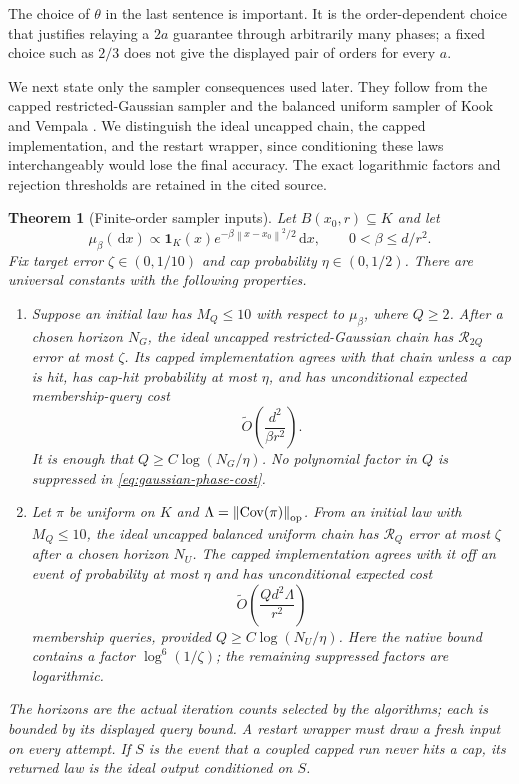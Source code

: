 \documentclass[11pt]{article}
\newtheorem{theorem}{Theorem}[section]
\theoremstyle{remark}
\newcommand{\1}{\bm 1}
\newcommand{\Cov}{\operatorname{Cov}}
\newcommand{\dd}{\,\mathrm d}
\newcommand{\norm}[1]{\left\lVert #1\right\rVert}
\begin{document}
The choice of $\theta$ in the last sentence is important.  It is the
order-dependent choice that justifies relaying a $2a$ guarantee through
arbitrarily many phases; a fixed choice such as $2/3$ does not give the
displayed pair of orders for every $a$.

We next state only the sampler consequences used later.  They follow
from the capped restricted-Gaussian sampler and the balanced uniform
sampler of Kook and Vempala
\citep[Theorems~1.1 and~1.4 and Proposition~4.1]{KV26zeroth}.  We
distinguish the ideal uncapped chain, the capped implementation, and the
restart wrapper, since conditioning these laws interchangeably would
lose the final accuracy.  The exact logarithmic factors and rejection
thresholds are retained in the cited source.

\begin{theorem}[Finite-order sampler inputs]
\label{thm:sampler-inputs}
Let $B(x_0,r)\subseteq K$ and let
\[
  \mu_\beta(\dd x)\propto
  \1_K(x)e^{-\beta\norm{x-x_0}^2/2}\dd x,
  \qquad 0<\beta\leq d/r^2.
\]
Fix target error $\zeta\in(0,1/10)$ and cap probability
$\eta\in(0,1/2)$.  There are universal constants with the following
properties.

\begin{enumerate}[label=(\roman*)]
\item Suppose an initial law has $M_Q\leq10$ with respect to
  $\mu_\beta$, where $Q\geq2$.  After a chosen horizon $N_G$, the ideal
  uncapped restricted-Gaussian chain has $\mathcal R_{2Q}$ error at most
  $\zeta$.  Its capped implementation agrees with that chain unless a
  cap is hit, has cap-hit probability at most $\eta$, and has
  unconditional expected membership-query cost
  \begin{equation}\label{eq:gaussian-phase-cost}
    \widetilde O\!\left(\frac{d^2}{\beta r^2}\right).
  \end{equation}
  It is enough that $Q\geq C\log(N_G/\eta)$.  No polynomial factor in
  $Q$ is suppressed in \eqref{eq:gaussian-phase-cost}.

\item Let $\pi$ be uniform on $K$ and
  $\Lambda=\norm{\Cov(\pi)}_{\rm op}$.  From an initial law with
  $M_Q\leq10$, the ideal uncapped balanced uniform chain has
  $\mathcal R_Q$ error at most $\zeta$ after a chosen horizon $N_U$.
  The capped implementation agrees with it off an event of probability
  at most $\eta$ and has unconditional expected cost
  \begin{equation}\label{eq:uniform-phase-cost}
    \widetilde O\!\left(
       \frac{Qd^2\Lambda}{r^2}\right)
  \end{equation}
  membership queries, provided $Q\geq C\log(N_U/\eta)$.  Here the
  native bound contains a factor $\log^6(1/\zeta)$; the remaining
  suppressed factors are logarithmic.
\end{enumerate}

The horizons are the actual iteration counts selected by the algorithms;
each is bounded by its displayed query bound.  A restart wrapper must
draw a fresh input on every attempt.  If $S$ is the event that a coupled
capped run never hits a cap, its returned law is the ideal output
conditioned on $S$.
\end{theorem}
\end{document}
